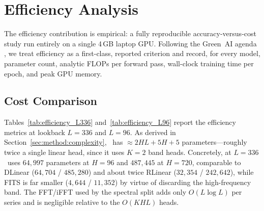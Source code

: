 \section{Efficiency Analysis}
\label{sec:efficiency}

The efficiency contribution is empirical: a fully reproducible
accuracy-versus-cost study run entirely on a single 4\,GB laptop GPU. Following
the Green~AI agenda \citep{schwartz2020greenai,strubell2019energy}, we treat
efficiency as a first-class, reported criterion and record, for every model,
parameter count, analytic FLOPs per forward pass, wall-clock training time per
epoch, and peak GPU memory.

\subsection{Cost Comparison}
\label{sec:eff:cost}

Tables~\ref{tab:efficiency_L336} and~\ref{tab:efficiency_L96} report the
efficiency metrics at lookback $L{=}336$ and $L{=}96$. As derived in
Section~\ref{sec:method:complexity}, \method\ has $\approx 2HL + 5H + 5$
parameters---roughly twice a single linear head, since it uses $K{=}2$ band
heads. Concretely, at $L{=}336$ \method\ uses $64{,}997$ parameters at $H{=}96$
and $487{,}445$ at $H{=}720$, comparable to DLinear ($64{,}704$ / $485{,}280$)
and about twice RLinear ($32{,}354$ / $242{,}642$), while FITS is far smaller
($4{,}644$ / $11{,}352$) by virtue of discarding the high-frequency band. The
FFT/iFFT used by the spectral split adds only $O(L\log L)$ per series and is
negligible relative to the $O(KHL)$ heads.



